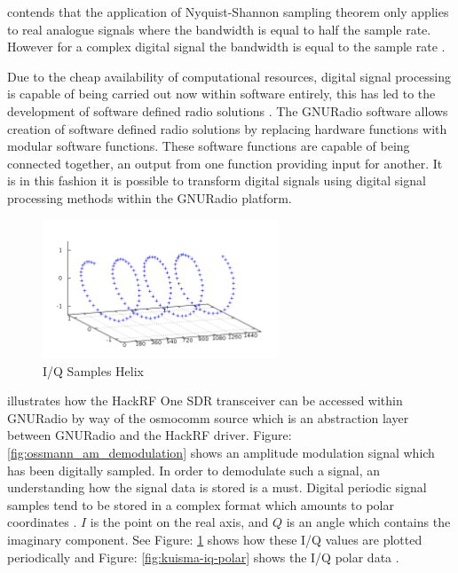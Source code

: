 \documentclass[runningheads,a4paper]{llncs}
\begin{document}
\cite{ossmann-15-b} contends that the application of Nyquist-Shannon sampling theorem only applies to real analogue signals where the bandwidth is equal to half the sample rate. However for a complex digital signal  the bandwidth is equal to the sample rate \citep{ossmann-15-b}.

Due to the cheap availability of computational resources, digital signal processing is capable of being carried out now within software entirely, this has led to the development of software defined radio solutions \citep{freidt-13}. The GNURadio software allows creation of software defined radio solutions by replacing hardware functions with modular software functions. These software functions are capable of being connected together, an output from one function providing input for another. It is in this fashion it is possible to transform digital signals using digital signal processing methods within the GNURadio platform\citep{gnuradio-14}.

%
\begin{figure}[here]
\centering
\includegraphics[width=7cm]{images/48}
\caption{I/Q Samples Helix \citep{kuisma-14}}
\label{fig:kuisma-iq-helix}
\end{figure}
%

\cite{ossmann-15-a} illustrates how the HackRF One \gls{SDR} transceiver can be accessed within GNURadio by way of the osmocomm source which is an abstraction layer between GNURadio and the HackRF driver. Figure: \ref{fig:ossmann_am_demodulation} shows an amplitude modulation signal which has been digitally sampled. In order to demodulate such a signal, an understanding how the signal data is stored is a must. Digital periodic signal samples tend to be stored in a complex format which amounts to polar coordinates \citep{ossmann-15-c}. $I$ is the point on the real axis, and $Q$ is an angle which contains the imaginary component. See Figure: \ref{fig:kuisma-iq-helix} shows how these I/Q values are plotted periodically and Figure: \ref{fig:kuisma-iq-polar} shows the I/Q polar data \citep{kuisma-14}.
\end{document}
